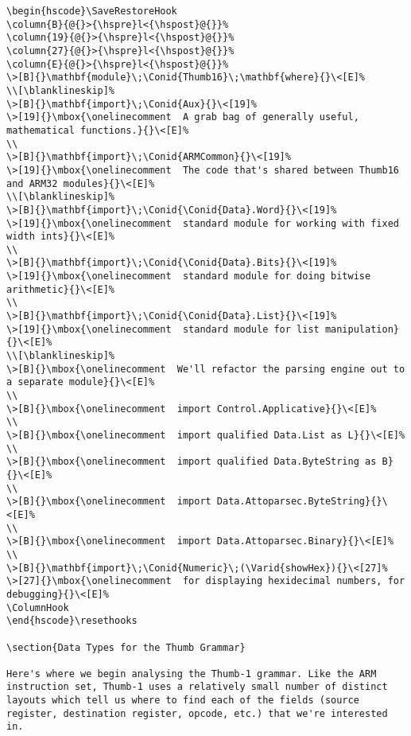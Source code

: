 \documentclass{article}
\newcommand{\Conid}[1]{\mathit{#1}}
\newcommand{\Varid}[1]{\mathit{#1}}
\def\resethooks{%
  \global\let\SaveRestoreHook\empty
  \global\let\ColumnHook\empty}
\newlength{\blanklineskip}
\let\hspre\empty
\let\hspost\empty
\begin{document}
\begin{Verbatim}[fontsize=\scriptsize]
\begin{hscode}\SaveRestoreHook
\column{B}{@{}>{\hspre}l<{\hspost}@{}}%
\column{19}{@{}>{\hspre}l<{\hspost}@{}}%
\column{27}{@{}>{\hspre}l<{\hspost}@{}}%
\column{E}{@{}>{\hspre}l<{\hspost}@{}}%
\>[B]{}\mathbf{module}\;\Conid{Thumb16}\;\mathbf{where}{}\<[E]%
\\[\blanklineskip]%
\>[B]{}\mathbf{import}\;\Conid{Aux}{}\<[19]%
\>[19]{}\mbox{\onelinecomment  A grab bag of generally useful, mathematical functions.}{}\<[E]%
\\
\>[B]{}\mathbf{import}\;\Conid{ARMCommon}{}\<[19]%
\>[19]{}\mbox{\onelinecomment  The code that's shared between Thumb16 and ARM32 modules}{}\<[E]%
\\[\blanklineskip]%
\>[B]{}\mathbf{import}\;\Conid{\Conid{Data}.Word}{}\<[19]%
\>[19]{}\mbox{\onelinecomment  standard module for working with fixed width ints}{}\<[E]%
\\
\>[B]{}\mathbf{import}\;\Conid{\Conid{Data}.Bits}{}\<[19]%
\>[19]{}\mbox{\onelinecomment  standard module for doing bitwise arithmetic}{}\<[E]%
\\
\>[B]{}\mathbf{import}\;\Conid{\Conid{Data}.List}{}\<[19]%
\>[19]{}\mbox{\onelinecomment  standard module for list manipulation}{}\<[E]%
\\[\blanklineskip]%
\>[B]{}\mbox{\onelinecomment  We'll refactor the parsing engine out to a separate module}{}\<[E]%
\\
\>[B]{}\mbox{\onelinecomment  import Control.Applicative}{}\<[E]%
\\
\>[B]{}\mbox{\onelinecomment  import qualified Data.List as L}{}\<[E]%
\\
\>[B]{}\mbox{\onelinecomment  import qualified Data.ByteString as B}{}\<[E]%
\\
\>[B]{}\mbox{\onelinecomment  import Data.Attoparsec.ByteString}{}\<[E]%
\\
\>[B]{}\mbox{\onelinecomment  import Data.Attoparsec.Binary}{}\<[E]%
\\
\>[B]{}\mathbf{import}\;\Conid{Numeric}\;(\Varid{showHex}){}\<[27]%
\>[27]{}\mbox{\onelinecomment  for displaying hexidecimal numbers, for debugging}{}\<[E]%
\ColumnHook
\end{hscode}\resethooks

\section{Data Types for the Thumb Grammar}

Here's where we begin analysing the Thumb-1 grammar. Like the ARM instruction set, Thumb-1 uses a relatively small number of distinct layouts which tell us where to find each of the fields (source register, destination register, opcode, etc.) that we're interested in. 


\end{Verbatim}
\end{document}
